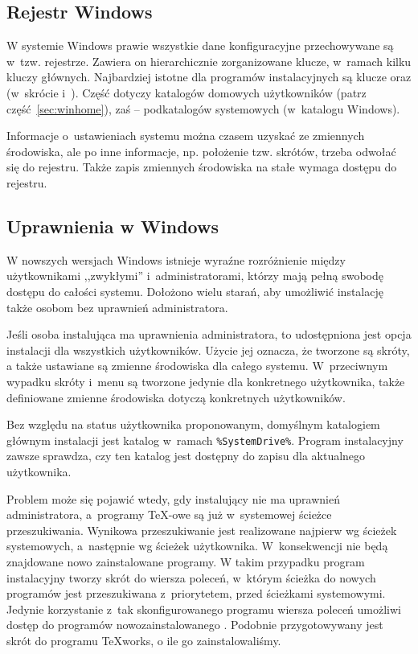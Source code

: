 \documentclass{article}
\begin{document}
\subsection{Rejestr Windows}
\label{sec:registry}

W systemie Windows prawie wszystkie dane konfiguracyjne przechowywane są
w~tzw. rejestrze. Zawiera on hierarchicznie zorganizowane klucze, w~ramach
kilku kluczy głównych. Najbardziej istotne dla programów instalacyjnych
są klucze  oraz 
(w~skrócie  i~). Część  dotyczy katalogów
domowych użytkowników (patrz część~\ref{sec:winhome}), zaś  -- podkatalogów
systemowych (w~katalogu Windows).

Informacje o~ustawieniach systemu można czasem uzyskać ze zmiennych
środowiska, ale po inne informacje, np. położenie tzw. skrótów, trzeba
odwołać się  do rejestru. Także  zapis zmiennych środowiska na stałe wymaga
dostępu do rejestru.

\subsection{Uprawnienia w Windows}
\label{sec:winpermissions}



W nowszych wersjach Windows istnieje wyraźne rozróżnienie między
użytkownikami ,,zwykłymi'' i~administratorami, którzy mają
pełną swobodę dostępu do całości systemu.
Dołożono wielu starań, aby umożliwić instalację \TL{} także  osobom bez
uprawnień administratora.

Jeśli osoba instalująca ma uprawnienia administratora, to udostępniona jest
opcja instalacji dla wszystkich użytkowników. Użycie jej oznacza, że tworzone
są skróty, a  także  ustawiane są zmienne środowiska dla całego systemu.
W~przeciwnym wypadku skróty i~menu są tworzone jedynie dla konkretnego
użytkownika, także  definiowane zmienne środowiska dotyczą konkretnych
użytkowników.

Bez względu na status użytkownika proponowanym, domyślnym katalogiem głównym
instalacji jest katalog w~ramach \verb|%SystemDrive%|. Program instalacyjny
zawsze sprawdza, czy ten katalog jest dostępny do zapisu dla aktualnego
użytkownika.

Problem może się  pojawić wtedy, gdy instalujący \TL{} nie ma uprawnień
administratora, a~programy \TeX-owe są już w~systemowej ścieżce przeszukiwania.
Wynikowa przeszukiwanie jest realizowane najpierw wg ścieżek systemowych,
a~następnie wg ścieżek użytkownika. W~konsekwencji nie będą znajdowane nowo
zainstalowane programy. W takim przypadku program instalacyjny tworzy skrót
do wiersza poleceń, w~którym ścieżka do nowych programów \TL{} jest przeszukiwana
z~priorytetem, przed ścieżkami systemowymi. Jedynie korzystanie z~tak skonfigurowanego
programu wiersza poleceń umożliwi dostęp do  programów nowozainstalowanego \TL.
Podobnie przygotowywany jest skrót do programu \TeX{}works, o ile go zainstalowaliśmy.
\end{document}
